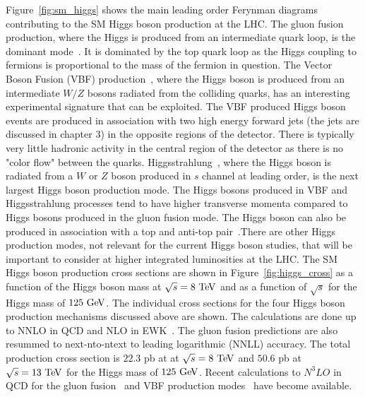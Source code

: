 Figure~\ref{fig:sm_higgs} shows the main leading order Ferynman diagrams contributing to the SM Higgs boson production at the LHC. The gluon fusion production, where the Higgs is produced from an intermediate quark loop, is the dominant mode~\cite{Georgi:1977gs}. It is dominated by the top quark loop as the Higgs coupling to fermions is proportional to the mass of the fermion in question. The Vector Boson Fusion (VBF) production~\cite{Cahn:1983ip}, where the Higgs boson is produced from an intermediate $W/Z$ bosons radiated from the colliding quarks, has an interesting experimental signature that can be exploited.  The VBF produced Higgs boson events are produced in association with two high energy forward jets (the jets are discussed in chapter $3$) in the opposite regions of the detector.  There is typically very little hadronic activity in the central region of the detector as there is no "color flow" between the quarks. Higgsstrahlung~\cite{Glashow:1978ab}, where the Higgs boson is radiated from a $W$ or $Z$ boson produced in $s$ channel at leading order, is the next largest Higgs boson production mode.  The Higgs bosons produced in VBF and Higgsstrahlung processes tend to have higher transverse momenta compared to Higgs bosons produced in the gluon fusion mode. The Higgs boson can also be produced in association with a top and anti-top pair~\cite{Raitio:1978pt,Ng:1983jm,Kunszt:1984ri,Marciano:1991qq}.There are other Higgs production modes, not relevant for the current Higgs boson studies, that will be important to consider at higher integrated luminosities at the LHC. The SM Higgs boson production cross sections are shown in Figure~\ref{fig:higgs_cross} as a function of the Higgs boson mass at $\sqrt{s}=8~\mathrm{Te\kern -0.1em V}$ and as a function of $\sqrt{s}$ for the Higgs mass of $125~\mathrm{Ge\kern -0.1em V}$. The individual cross sections for the four Higgs boson production mechanisms discussed above are shown. The calculations are done up to NNLO in QCD and NLO in EWK~\cite{Dittmaier:2011ti,Dittmaier:2012vm,Heinemeyer:2013tqa}. The gluon fusion predictions are also resummed to next-nto-ntext to leading logarithmic (NNLL) accuracy. The total production cross section is $22.3$ pb at   at $\sqrt{s}=8~\mathrm{Te\kern -0.1em V}$ and $50.6$ pb at $\sqrt{s}=13~\mathrm{Te\kern -0.1em V}$ for the Higgs mass of $125~\mathrm{Ge\kern -0.1em V}$.  Recent calculations to $N^{3}LO$ in QCD for the gluon fusion~\cite{Anastasiou:2016cez} and VBF production modes~\cite{Dreyer:2016oyx} have become available. 

